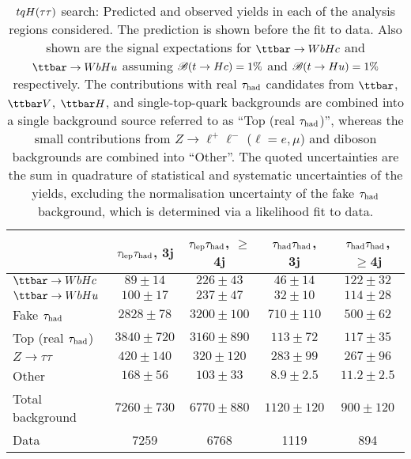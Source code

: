 \begin{table}[htbp]
\caption{
$tqH(\tau\tau)$ search: Predicted and observed yields in each of the analysis regions considered.
The prediction is shown before the fit to data. Also shown are the signal expectations for 
$\Hc$ and $\Hu$ assuming $\mathscr{B}(t\to Hc)=1\%$ and $\mathscr{B}(t\to Hu)=1\%$ respectively.
The contributions with real $\tau_{\mathrm{had}}$ candidates from $\ttbar$,  $\ttbar V$, $\ttbar H$, and single-top-quark backgrounds are combined into
a single background source referred to as ``Top (real $\tau_{\mathrm{had}}$)'', whereas the small contributions from 
$Z\to \ell^+\ell^-$ ($\ell = e, \mu$) and diboson backgrounds are combined into ``Other''. 
The quoted uncertainties are the sum in quadrature of statistical and systematic uncertainties of the yields, 
excluding the normalisation uncertainty of the fake $\tau_{\mathrm{had}}$ background, which is determined via a likelihood fit to data.
}
\small
\begin{center}
\begin{tabular}{l*{4}{c}}
\hline\hline
 & $\tau_{\mathrm{lep}} \tau_{\mathrm{had}}$, 3j & $\tau_{\mathrm{lep}} \tau_{\mathrm{had}}$, $\geq$4j & $\tau_{\mathrm{had}} \tau_{\mathrm{had}}$, 3j &  $\tau_{\mathrm{had}} \tau_{\mathrm{had}}$, $\geq$4j \\
\hline
$\Hc$  &   $ 89 \pm 14 $ &   $ 226 \pm 43 $ &   $ 46 \pm 14 $ &   $ 122 \pm 32 $ \\ 
$\Hu$  &   $ 100 \pm 17 $ &   $ 237 \pm 47 $ &   $ 32 \pm 10 $ &   $ 114 \pm 28 $ \\ 
\hline
Fake $\tau_{\mathrm{had}}$  &   $ 2828 \pm 78 $ &   $ 3200 \pm 100 $ &   $ 710 \pm 110 $ &   $ 500 \pm 62 $ \\
Top (real $\tau_{\mathrm{had}}$)  &   $ 3840 \pm 720 $ &   $ 3160 \pm 890 $ &   $ 113 \pm 72 $ &   $ 117 \pm 35 $ \\  
$Z \to \tau\tau$  &   $ 420 \pm 140 $ &   $ 320 \pm 120 $ &   $ 283 \pm 99 $ &   $ 267 \pm 96 $ \\ 
Other  &   $ 168 \pm 56 $ &   $ 103 \pm 33 $ &   $ 8.9 \pm 2.5 $ &   $ 11.2 \pm 2.5 $ \\ 
\hline
Total background  &   $ 7260 \pm 730 $ &   $ 6770 \pm 880 $ &   $ 1120 \pm 120 $ &   $ 900 \pm 120 $ \\ 
\hline
Data  & 7259  & 6768  & 1119  & 894  \\
\hline\hline    
\end{tabular}

%
\end{center}
\label{tab:Htautau_Prefit_Yields_Unblind}
\end{table} 

